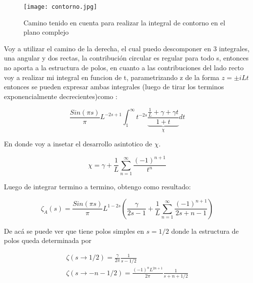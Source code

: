 \begin{figure}
\centering
\texttt{[image: contorno.jpg]}
\caption{Camino tenido en cuenta para realizar la integral de contorno en el plano complejo}
\label{fig:contorno}
\end{figure}


Voy a utilizar el camino de la derecha, el cual puedo descomponer en 3 integrales, una angular y dos rectas, la contribución circular es regular para todo s, entonces no aporta a la estructura de polos, en cuanto a las contribuciones del lado recto voy a realizar mi integral en funcion de t, parametrizando z de la forma $z = \pm i L t$ entonces se pueden expresar ambas integrales (luego de tirar los terminos exponencialmente decrecientes)como  :

\begin{equation}
    \frac{Sin(\pi s)}{ \pi } L ^{-2s+1}
    \int _1 ^{\infty} 
    t ^{-2s}
    \underbrace
    {
	\frac{ \frac{1}{L} + \gamma + \gamma t}
	{1+ t}
	} _{\chi}
    dt 
\label{contorno}
\end{equation}

En donde voy a insetar el desarrollo asintotico de   $\chi$. 

\begin{equation}
    \chi = \gamma + \frac{1}{L} \sum _{n=1} ^{\infty} \frac{(-1) ^{n+1}}{t ^n}
\label{eq:chi}
\end{equation}

Luego de integrar termino a termino, obtengo como resultado:

\begin{equation}
    \zeta _A (s) = 
    \frac{Sin(\pi s)}{\pi} L ^{1-2s}
    \left(
    \frac{\gamma}{2s-1} + 
    \frac{1}{L}
    \sum _{n=1} ^{\infty}
    \frac{(-1) ^{n+1}}{2s+n-1}
    \right)
\label{eq.zeta.com}
\end{equation}

De acá se puede ver que tiene polos simples en $s=1/2$ donde la estructura de polos queda determinada por

\begin{equation}
\begin{array}{c}

\zeta(s \rightarrow 1/2) = \frac{\gamma}{2 \pi} \frac{1}{s-1/2} \\
\zeta (s \rightarrow -n - 1/2)  = \frac{ (-1) ^n L ^{2n+1}  }{2 \pi} \frac{1}{s + n + 1/2}

\end{array}
\end{equation}


